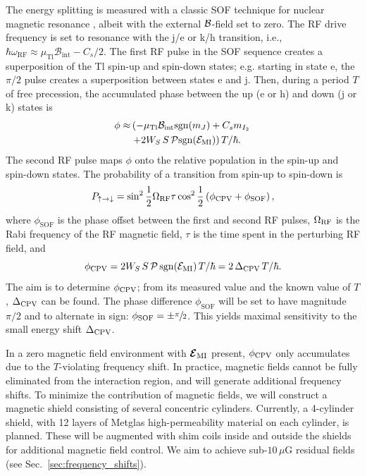 The energy splitting is measured with a classic SOF technique for nuclear magnetic resonance \cite{PhysRev.78.695,ramsey1951phase}, albeit with the external $\mathcal{B}$-field set to zero. 
The RF drive frequency is set to resonance with the j/e or k/h transition, i.e., $\hbar\omega_\mathrm{RF} \approx \mu_\mathrm{Tl}\mathcal{B}_\mathrm{int}- C_s/2$.
The first RF pulse in the SOF sequence creates a superposition of the Tl spin-up and spin-down states; e.g. starting in state e, the $\pi/2$ pulse creates a superposition between states e and j. Then, during a period $T$ of free precession, the accumulated phase between the up (e or h) and down (j or k) states is
\begin{equation}
    \begin{split}
        \phi \approx & \left( -\mu_\textrm{Tl}\mathcal{B}_\textrm{int}\mathrm{sgn}(m_J) + C_s m_{I_2} \right. \\ & \left. + 2 W_S\,S\,\mathcal{P}\mathrm{sgn}(\mathcal{E}_{\rm MI}) \right)T/h\hspace*{-0.3em}\bar{}\hspace*{0.25em}.
    \end{split}
\end{equation}
The second RF pulse maps $\phi$ onto the relative population in the spin-up and spin-down states.
The probability of a transition from spin-up to spin-down is \cite{ramsey1951phase}
\begin{equation}
    P_{\uparrow \rightarrow \downarrow} = \sin^2 \frac{1}{2} \Omega_{\rm RF} \tau \cos^2 \frac{1}{2}\left(\phi_{\rm CPV} + \phi_\mathrm{SOF}\right),
\end{equation}
where $\phi_\mathrm{SOF}$ is the phase offset between the first and second RF pulses, $\Omega_{\rm RF}$ is the Rabi frequency of the RF magnetic field, $\tau$ is the time spent in the perturbing RF field, and
\begin{equation}
    \phi_{\rm CPV} = 2W_S\,S\,\mathcal{P}\,\mathrm{sgn}(\mathcal{E}_{\rm MI})\,T/h\hspace*{-0.3em}\bar{}\hspace*{0.25em} = 2\,\Delta_{\rm CPV}\,T/h\hspace*{-0.3em}\bar{}\hspace*{0.25em}.
\end{equation}
The aim is to determine $\phi_{\rm CPV}$; from its measured value and the known value of $T$, $\Delta_{\rm CPV}$ can be found.
The phase difference $\phi_\mathrm{SOF}$ will be set to have magnitude $\pi/2$ and to alternate in sign: $\phi_\mathrm{SOF} = \pm\sfrac{\pi}{2}$. This yields maximal sensitivity to the small energy shift $\Delta_{\rm CPV}$.

In a zero magnetic field environment with $\bm{\mathcal{E}}_\mathrm{MI}$ present, $\phi_{\rm CPV}$ only accumulates due to the $T$-violating frequency shift. In practice, magnetic fields cannot be fully eliminated from the interaction region, and will generate additional frequency shifts. To minimize the contribution of magnetic fields, we will construct a magnetic shield consisting of several concentric cylinders. Currently, a 4-cylinder shield, with 12 layers of Metglas high-permeability material \cite{jiles2015magnetism} on each cylinder, is planned. These will be augmented with shim coils inside and outside the shields for additional magnetic field control. We aim to achieve sub-$10\,\mu$G residual fields (see Sec.~\ref{sec:frequency_shifts}).


